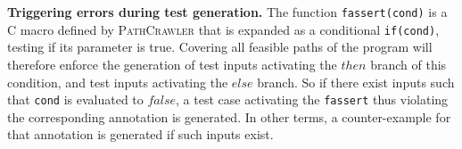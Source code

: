 \textbf{Triggering errors during test generation.}
The function \lstinline|fassert(cond)| is a C macro defined by
\textsc{PathCrawler} that is expanded as a conditional
\lstinline|if(cond)|, testing
if its parameter is true. Covering all feasible paths of the
program will therefore enforce the generation of test inputs activating the
$then$ branch of this condition, and test inputs activating the
$else$ branch. So if there exist inputs such that \lstinline'cond' is evaluated to
$false$, a test case activating the \lstinline|fassert| thus
violating the corresponding annotation is generated. In other terms, a
counter-example for that annotation is generated if such inputs exist.
